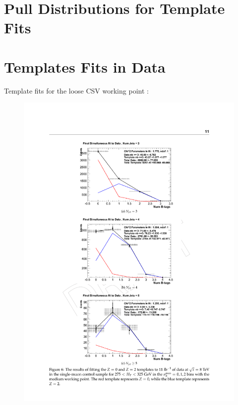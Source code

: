 \FloatBarrier

\section{Pull Distributions for Template Fits}
\label{app:templatepulldistributions}

\section{Templates Fits in Data}
\label{app:templatedata}

Template fits for the loose \ac{CSV} working point :

\begin{figure}[ht]
\centering
\begin{minipage}[b]{0.48 \linewidth}
\includegraphics[width = 1.0\linewidth]{plots/template_data_medium_njet5_lowht.pdf}

\end{minipage}
\end{figure}
